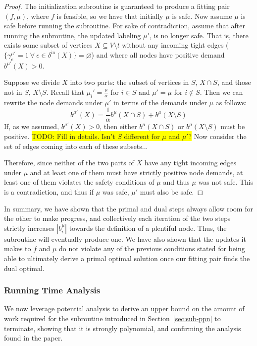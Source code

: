 \documentclass[11pt]{article}
\theoremstyle{definition}
\theoremstyle{definition}
\newcommand{\biu}{b_{i}^{\mu}}
\newcommand{\vnott}{V \setminus t}
\newcommand{\din}{\delta^{\text{in}}}
\newcommand{\fp}{(f,\mu)}
\newcommand{\todo}[1]{\colorbox{yellow}{TODO: #1}}
\begin{document}
\begin{proof}
The initialization subroutine is guaranteed to produce a fitting pair $\fp$,
where $f$ is feasible, so we have that initially $\mu$ is safe. Now assume $\mu$
is safe before running the subroutine. For sake of contradiction, assume that
after running the subroutine, the updated labeling $\mu'$,
is no longer safe. That is, there exists some subset of vertices $X \subseteq \vnott$  
without any incoming tight edges ($\{\gamma_e^{\mu'} = 1\ \forall\ e \in \din(X)\} = \varnothing$)
and where all nodes have positive demand $b^{\mu'}(X) > 0$.

Suppose we divide $X$ into two parts: the subset of vertices in $S$, $X \cap S$, and those
not in $S$, $X \setminus S$. Recall that $\mu_i' = \frac{\mu}{\alpha}$ for $i\in S$
and $\mu' = \mu$ for $i \notin S$. Then we can rewrite the node demands under $\mu'$
in terms of the demands under $\mu$ as follows:
$$b^{\mu'}(X) = \frac{1}{\alpha}b^{\mu}(X \cap S) + b^{\mu}(X \setminus S)$$
If, as we assumed, $b^{\mu'}(X) > 0$, then either $b^{\mu}(X \cap S)$ or 
$b^{\mu}(X \setminus S)$ must be positive.
\todo{Fill in details. Isn't $S$ different for $\mu$ and $\mu'$?}
Now consider the set of edges coming into each of these subsets...

Therefore, since neither of the two parts of $X$
have any tight incoming edges under $\mu$ and at least one of them
must have strictly positive node demands, at least one of them
violates the safety conditions of $\mu$ and thus $\mu$ was not safe.
This is a contradiction, and thus if $\mu$ was safe, $\mu'$ must also be safe.

\end{proof}

In summary, we have shown that the primal and dual steps always allow room for the other to make progress, and collectively each iteration of the two steps strictly increases $|\biu|$ towards
the definition of a plentiful node. Thus, the subroutine will eventually produce one. We have also shown that the updates it makes to $f$ and $\mu$ do not violate any of the previous conditions stated for being able to ultimately derive a primal optimal solution once our fitting pair finds the dual optimal. 

\subsubsection{Running Time Analysis}

We now leverage potential analysis to derive an upper bound on the amount of work required for the subroutine introduced in Section~\ref{sec:sub-ppn} to terminate, showing that it is strongly polynomial, and confirming the analysis found in the paper. 
\end{document}

